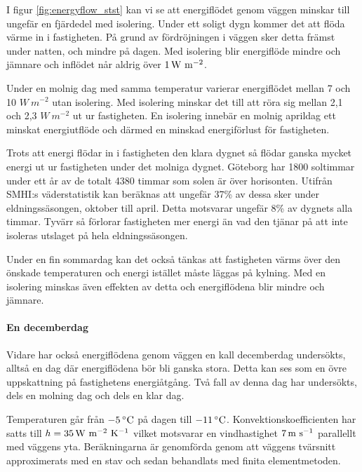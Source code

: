 I figur \ref{fig:energyflow_stst} kan vi se att energiflödet genom väggen minskar till 
ungefär en fjärdedel med isolering. Under ett soligt dygn kommer det att flöda värme in i
 fastigheten. På grund av fördröjningen i väggen sker detta främst under natten, 
 och mindre på dagen. Med isolering blir energiflöde mindre och jämnare och inflödet når aldrig över $\unit[1]{W~m^{-2}}$.

Under en molnig dag med samma temperatur varierar energiflödet mellan 7 och 10 
$\unit{W~m^{-2}}$ utan isolering. Med isolering minskar det till att röra sig mellan 2,1 och 2,3 $\unit{W~m^{-2}}$ ut ur 
fastigheten. En isolering innebär en molnig aprildag ett minskat energiutflöde och därmed en minskad 
energiförlust för fastigheten.

Trots att energi flödar in i fastigheten den klara dygnet så flödar ganska mycket energi 
ut ur fastigheten under det molniga dygnet. Göteborg har 1800 soltimmar under ett
 år av de totalt 4380 timmar som solen är över horisonten. Utifrån SMHI:s väderstatistik \cite{SMHIdata}
 kan beräknas att ungefär 37\% av dessa sker under eldningssäsongen, oktober till april. 
 Detta motsvarar ungefär 8\% av dygnets alla timmar. Tyvärr så förlorar fastigheten mer 
 energi än vad den tjänar på att inte isoleras utslaget på hela eldningssäsongen.

Under en fin sommardag kan det också tänkas att fastigheten värms över den önskade 
temperaturen och energi istället måste läggas på kylning. Med en isolering minskas även 
effekten av detta och energiflödena blir mindre och jämnare.

\paragraph{En decemberdag}

Vidare har också energiflödena genom väggen en kall decemberdag undersökts, 
alltså en dag där energiflödena bör bli ganska stora. Detta kan ses som en övre uppskattning på fastighetens energiåtgång. Två fall av
denna dag har undersökts, dels en molning dag och dels en klar dag.

 Temperaturen går från $\unit[-5]{^\circ C}$ på dagen till $\unit[-11]{^\circ C}$. 
 Konvektionskoefficienten har satts till $h=\unit[35]{W~m^{-2}~K^{-1}}$ 
 vilket motsvarar en vindhastighet $\unit[7]{m~s^{-1}}$ parallellt med väggens yta. 
 Beräkningarna är genomförda genom att väggens tvärsnitt approximerats med en stav och sedan behandlats med finita elementmetoden.


